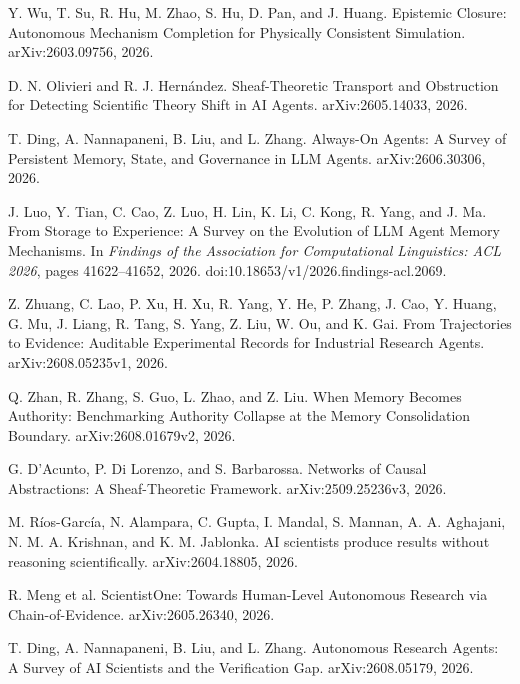  Y. Wu, T. Su, R. Hu, M. Zhao, S. Hu, D. Pan, and J. Huang. Epistemic Closure: Autonomous Mechanism Completion for Physically Consistent Simulation. arXiv:2603.09756, 2026.

 D. N. Olivieri and R. J. Hern\'andez. Sheaf-Theoretic Transport and Obstruction for Detecting Scientific Theory Shift in AI Agents. arXiv:2605.14033, 2026.

 T. Ding, A. Nannapaneni, B. Liu, and L. Zhang. Always-On Agents: A Survey of Persistent Memory, State, and Governance in LLM Agents. arXiv:2606.30306, 2026.

 J. Luo, Y. Tian, C. Cao, Z. Luo, H. Lin, K. Li, C. Kong, R. Yang, and J. Ma. From Storage to Experience: A Survey on the Evolution of LLM Agent Memory Mechanisms. In \emph{Findings of the Association for Computational Linguistics: ACL 2026}, pages 41622--41652, 2026. doi:10.18653/v1/2026.findings-acl.2069.

 Z. Zhuang, C. Lao, P. Xu, H. Xu, R. Yang, Y. He, P. Zhang, J. Cao, Y. Huang, G. Mu, J. Liang, R. Tang, S. Yang, Z. Liu, W. Ou, and K. Gai. From Trajectories to Evidence: Auditable Experimental Records for Industrial Research Agents. arXiv:2608.05235v1, 2026.

 Q. Zhan, R. Zhang, S. Guo, L. Zhao, and Z. Liu. When Memory Becomes Authority: Benchmarking Authority Collapse at the Memory Consolidation Boundary. arXiv:2608.01679v2, 2026.

 G. D'Acunto, P. Di Lorenzo, and S. Barbarossa. Networks of Causal Abstractions: A Sheaf-Theoretic Framework. arXiv:2509.25236v3, 2026.

M. R\'ios-Garc\'ia, N. Alampara, C. Gupta, I. Mandal, S. Mannan, A. A. Aghajani, N. M. A. Krishnan, and K. M. Jablonka. AI scientists produce results without reasoning scientifically. arXiv:2604.18805, 2026.

R. Meng et al. ScientistOne: Towards Human-Level Autonomous Research via Chain-of-Evidence. arXiv:2605.26340, 2026.

T. Ding, A. Nannapaneni, B. Liu, and L. Zhang. Autonomous Research Agents: A Survey of AI Scientists and the Verification Gap. arXiv:2608.05179, 2026.
